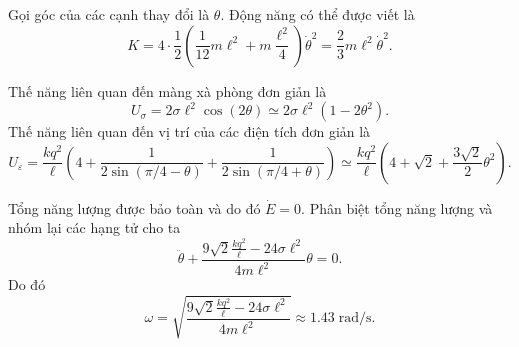 


\begin{solution}
Gọi góc của các cạnh thay đổi là $\theta$. Động năng có thể được viết là
\[K=4\cdot\frac{1}{2}\left(\frac{1}{12}m\ell^2+m\frac{\ell^2}{4}\right)\dot\theta^2=\frac 23 m\ell^2\dot\theta^2.\]

Thế năng liên quan đến màng xà phòng đơn giản là
\[U_\sigma=2\sigma\ell^2\cos(2\theta)\simeq 2\sigma\ell^2\left(1-2\theta^2\right).\]
Thế năng liên quan đến vị trí của các điện tích đơn giản là
\[U_\varepsilon=\frac{kq^2}{\ell}\left(4+\frac{1}{2\sin\left(\pi/4-\theta\right)}+\frac{1}{2\sin(\pi/4+\theta)}\right)\simeq \frac{kq^2}{\ell}\left(4+\sqrt{2}+\frac{3\sqrt{2}}{2}\theta^2\right).\]

Tổng năng lượng được bảo toàn và do đó $\dot E=0.$ Phân biệt tổng năng lượng và nhóm lại các hạng tử cho ta
\[\ddot\theta+\frac{9\sqrt{2}\frac{kq^2}{\ell}-24\sigma\ell^2}{4 m\ell^2}\theta=0.\]
Do đó
\[\omega=\sqrt{\frac{9\sqrt{2}\frac{kq^2}{\ell}-24\sigma\ell^2}{4 m\ell^2}}\approx \boxed{1.43\;\mathrm{rad/s}.}\]
\end{solution}
